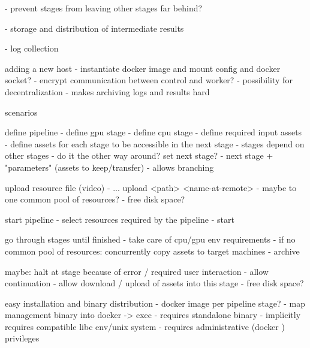 - prevent stages from leaving other stages far behind?

- storage and distribution of intermediate results

- log collection




adding a new host
 - instantiate docker image and mount config and docker socket?
 - encrypt communication between control and worker?
 - possibility for decentralization
    - makes archiving logs and results hard


scenarios

define pipeline
 - define gpu stage
 - define cpu stage
 - define required input assets
 - define assets for each stage to be accessible in the next stage
 - stages depend on other stages
    - do it the other way around? set next stage?
       - next stage + "parameters" (assets to keep/transfer)
       - allows branching

upload resource file (video)
 - ... upload <path> <name-at-remote>
 - maybe to one common pool of resources?
    - free disk space?

start pipeline
 - select resources required by the pipeline
 - start
 
go through stages until finished
 - take care of cpu/gpu env requirements
 - if no common pool of resources: concurrently copy assets to target machines
 - archive 

maybe: halt at stage because of error / required user interaction
 - allow continuation
 - allow download / upload of assets into this stage
    - free disk space?
 
 
 easy installation and binary distribution
  - docker image per pipeline stage?
  - map management binary into docker -> exec
     - requires standalone binary
     - implicitly requires compatible libc env/unix system
     - requires administrative (docker ) privileges